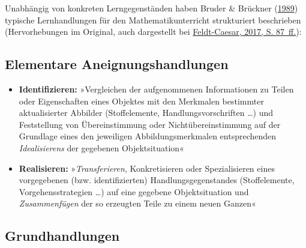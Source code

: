 \documentclass[
]{scrbook}
\providecommand{\tightlist}{%
  \setlength{\itemsep}{0pt}\setlength{\parskip}{0pt}}
\theoremstyle{definition}
\theoremstyle{definition}
\theoremstyle{definition}
\theoremstyle{definition}
\theoremstyle{remark}
\begin{document}
Unabhängig von konkreten Lerngegenständen haben Bruder \& Brückner (\protect\hyperlink{ref-Bruder1989}{1989}) typische Lernhandlungen für den Mathematikunterricht strukturiert beschrieben (Hervorhebungen im Original, auch dargestellt bei \protect\hyperlink{ref-Feldt-Caesar2017}{Feldt-Caesar, 2017, S. 87~ff.}):

\hypertarget{elementare-aneignungshandlungen}{%
\subsection{Elementare Aneignungshandlungen}\label{elementare-aneignungshandlungen}}

\begin{itemize}
\tightlist
\item
  \textbf{Identifizieren:} »Vergleichen der aufgenommenen Informationen zu Teilen oder Eigenschaften eines Objektes mit den Merkmalen bestimmter aktualisierter Abbilder (Stoffelemente, Handlungsvorschriften \ldots) und Feststellung von Übereinstimmung oder Nichtübereinstimmung auf der Grundlage eines den jeweiligen Abbildungsmerkmalen entsprechenden \emph{Idealisierens} der gegebenen Objektsituation«
\item
  \textbf{Realisieren:} »\emph{Transferieren}, Konkretisieren oder Spezialisieren eines vorgegebenen (bzw. identifizierten) Handlungsgegenstandes (Stoffelemente, Vorgehensstrategien \ldots) auf eine gegebene Objektsituation und \emph{Zusammenfügen} der so erzeugten Teile zu einem neuen Ganzen«
\end{itemize}

\hypertarget{grundhandlungen}{%
\subsection{Grundhandlungen}\label{grundhandlungen}}
\end{document}
